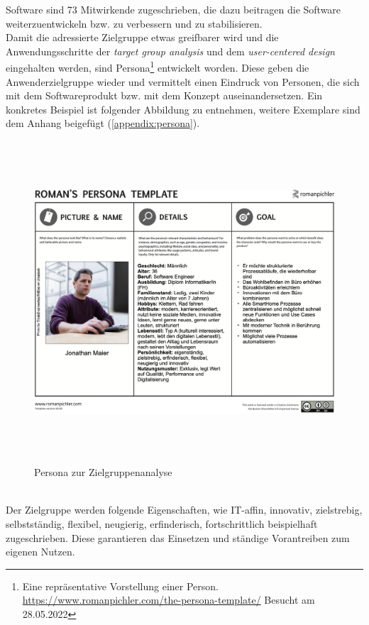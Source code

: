         Software sind 73 Mitwirkende zugeschrieben, die dazu beitragen die Software weiterzuentwickeln bzw. zu verbessern und zu 
        stabilisieren.
    \\
    \linebreak 
    Damit die adressierte Zielgruppe etwas greifbarer wird und die Anwendungsschritte der \textit{target group analysis} und 
    dem \textit{user-centered design} eingehalten werden, sind Persona\footnote{Eine repräsentative Vorstellung einer Person. \url{https://www.romanpichler.com/the-persona-template/} Besucht am 28.05.2022} 
    entwickelt worden. Diese geben die Anwenderzielgruppe wieder und vermittelt einen Eindruck von Personen, die sich mit dem 
    Softwareprodukt bzw. mit dem Konzept auseinandersetzen. Ein konkretes Beispiel ist folgender Abbildung zu entnehmen, weitere Exemplare sind dem Anhang beigefügt (\ref{appendix:persona}).
    \\
    \pagebreak
    \linebreak
    \begin{figure}[hbt!]
        \centering
        \includegraphics[width=16cm,height=12cm,keepaspectratio]{chapter/9Anhang/Persona-4_MA.png}
        \caption{Persona zur Zielgruppenanalyse}
        \label{fig:persona}
    \end{figure}
    \\
    Der Zielgruppe werden folgende Eigenschaften, wie IT-affin, innovativ, zielstrebig, selbstständig, flexibel, neugierig, erfinderisch, fortschrittlich beispielhaft zugeschrieben. 
    Diese garantieren das Einsetzen und ständige Vorantreiben zum eigenen Nutzen. 

